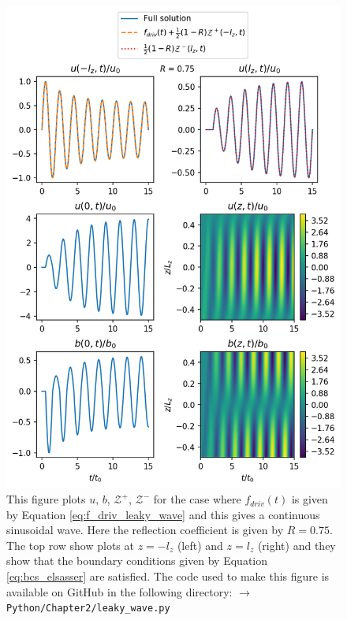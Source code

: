 \begin{figure}
    \centering
    \vspace{-20pt}
    \includegraphics[width=\textwidth,height=0.85\textheight,keepaspectratio]{figures/chapter02/leaky_wave.png}
    \vspace{-10pt}
    \caption{This figure plots $u$, $b$, $\mathcal{Z}^{+}$, $\mathcal{Z^{-}}$ for the case where $f_{driv}(t)$ is given by Equation \eqref{eq:f_driv_leaky_wave} and this gives a continuous sinusoidal wave. Here the reflection coefficient is given by $R=0.75$. The top row show plots at $z=-l_z$ (left) and $z=l_z$ (right) and they show that the boundary conditions given by Equation \eqref{eq:bcs_elsasser} are satisfied. The code used to make this figure is available on GitHub in the following directory:\newline
    \texttt{$\rightarrow$ Python/Chapter2/leaky\_wave.py}}
    \vspace{-30pt}
    \label{fig:leaky_wave}
\end{figure}

